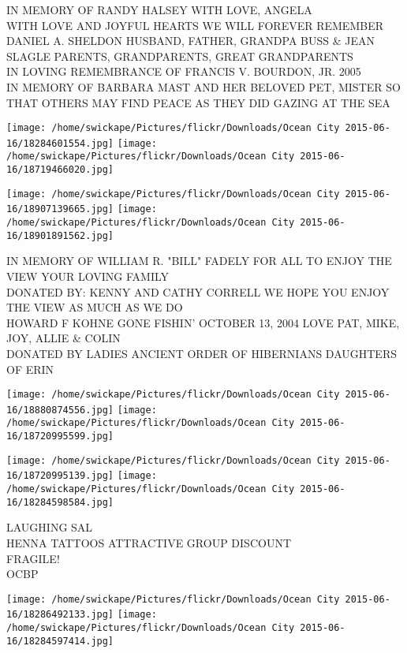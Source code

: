 \documentclass[10pt,letterpaper]{article}
\begin{document}
IN MEMORY OF RANDY HALSEY WITH LOVE, ANGELA\\
WITH LOVE AND JOYFUL HEARTS WE WILL FOREVER REMEMBER DANIEL A. SHELDON HUSBAND, FATHER, GRANDPA BUSS \& JEAN SLAGLE PARENTS, GRANDPARENTS, GREAT GRANDPARENTS\\
IN LOVING REMEMBRANCE OF FRANCIS V. BOURDON, JR. 2005\\
IN MEMORY OF BARBARA MAST AND HER BELOVED PET, MISTER SO THAT OTHERS MAY FIND PEACE AS THEY DID GAZING AT THE SEA\\
\pagebreak

\texttt{[image: /home/swickape/Pictures/flickr/Downloads/Ocean City 2015-06-16/18284601554.jpg]}
\texttt{[image: /home/swickape/Pictures/flickr/Downloads/Ocean City 2015-06-16/18719466020.jpg]}

\texttt{[image: /home/swickape/Pictures/flickr/Downloads/Ocean City 2015-06-16/18907139665.jpg]}
\texttt{[image: /home/swickape/Pictures/flickr/Downloads/Ocean City 2015-06-16/18901891562.jpg]}

IN MEMORY OF WILLIAM R. "BILL" FADELY FOR ALL TO ENJOY THE VIEW YOUR LOVING FAMILY\\
DONATED BY: KENNY AND CATHY CORRELL WE HOPE YOU ENJOY THE VIEW AS MUCH AS WE DO\\
HOWARD F KOHNE GONE FISHIN' OCTOBER 13, 2004 LOVE PAT, MIKE, JOY, ALLIE \& COLIN\\
DONATED BY LADIES ANCIENT ORDER OF HIBERNIANS DAUGHTERS OF ERIN\\
\pagebreak

\texttt{[image: /home/swickape/Pictures/flickr/Downloads/Ocean City 2015-06-16/18880874556.jpg]}
\texttt{[image: /home/swickape/Pictures/flickr/Downloads/Ocean City 2015-06-16/18720995599.jpg]}

\texttt{[image: /home/swickape/Pictures/flickr/Downloads/Ocean City 2015-06-16/18720995139.jpg]}
\texttt{[image: /home/swickape/Pictures/flickr/Downloads/Ocean City 2015-06-16/18284598584.jpg]}

LAUGHING SAL\\
HENNA TATTOOS ATTRACTIVE GROUP DISCOUNT\\
FRAGILE!\\
OCBP\\
\pagebreak

\texttt{[image: /home/swickape/Pictures/flickr/Downloads/Ocean City 2015-06-16/18286492133.jpg]}
\texttt{[image: /home/swickape/Pictures/flickr/Downloads/Ocean City 2015-06-16/18284597414.jpg]}
\end{document}
